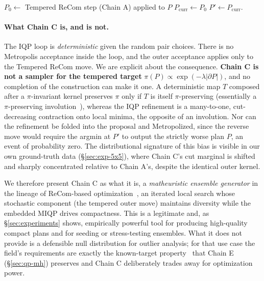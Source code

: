 \documentclass[11pt]{article}
\begin{document}
\begin{algorithm}[H]
\caption{One step of Chain C}\label{alg:chain-c}
$P_0 \gets $ Tempered ReCom step (Chain A) applied to $P$\;
$P_{\mathrm{curr}} \gets P_0$\;
\Return $P' \gets P_{\mathrm{curr}}$.
\end{algorithm}

\paragraph{What Chain C is, and is not.}\label{sec:chain-c-honest}
The IQP loop is \emph{deterministic} given the random pair choices. There is no Metropolis acceptance inside the loop, and the outer
acceptance applies only to the Tempered ReCom move. We are explicit
about the consequence. \textbf{Chain C is not a sampler for the
tempered target} $\pi(P) \propto \exp(-\lambda|\partial P|)$, and no
completion of the construction can make it one. A deterministic map
$T$ composed after a $\pi$-invariant kernel preserves $\pi$ only if
$T$ is itself $\pi$-preserving (essentially a $\pi$-preserving
involution~\cite{tierney1998note}), whereas the IQP refinement is a
many-to-one, cut-decreasing contraction onto local minima, the
opposite of an involution. Nor can the refinement be folded into the
proposal and Metropolized, since the reverse move would require the
argmin at $P'$ to output the strictly worse plan $P$, an event of
probability zero. The distributional signature of this bias is visible
in our own ground-truth data (\S\ref{sec:exp-5x5}), where Chain C's cut
marginal is shifted and sharply concentrated relative to Chain A's,
despite the identical outer kernel.

We therefore present Chain C as what it is, a \emph{matheuristic
ensemble generator} in the lineage of ReCom-based
optimization~\cite{cannon2023voting,brous2025recom}, an iterated
local search whose stochastic component (the tempered outer move)
maintains diversity while the embedded MIQP drives compactness. This
is a legitimate and, as \S\ref{sec:experiments} shows, empirically
powerful tool for producing high-quality compact plans and for
seeding or stress-testing ensembles. What it does not provide is a
defensible null distribution for outlier analysis; for that use case
the field's requirements are exactly the known-target
property~\cite{cannon2022spanning,mccartan2023sequential} that
Chain E (\S\ref{sec:qp-mh}) preserves and Chain C deliberately trades
away for optimization power.
\end{document}
